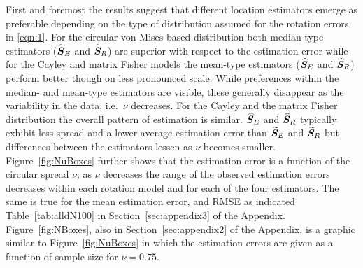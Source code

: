 First and foremost the results suggest that different location estimators emerge as preferable depending on the type of distribution assumed for the rotation errors in \eqref{eqn:1}.  For the circular-von Mises-based distribution both median-type estimators (${\widetilde{\bm S}_E}$ and ${\widetilde{\bm S}_R}$) are superior with respect to the estimation error while for the Cayley and matrix Fisher models the mean-type estimators (${\widehat{\bm S}_E}$ and ${\widehat{\bm S}_R}$) perform better though on less pronounced scale.  While preferences within the median- and mean-type estimators are visible, these generally disappear as the variability in the data, i.e.~$\nu$ decreases.  For the Cayley and the matrix Fisher distribution the overall pattern of estimation is similar. ${\widehat{\bm S}_E}$ and ${\widehat{\bm S}_R}$ typically exhibit less spread and a lower average estimation error than ${\widetilde{\bm S}_E}$ and ${\widetilde{\bm S}_R}$ but differences between the estimators lessen as $\nu$ becomes smaller. Figure~\ref{fig:NuBoxes} further shows that the estimation error is a function of the circular spread $\nu$; as $\nu$ decreases the range of the observed estimation errors decreases within each rotation model and for each of the four estimators. The same is true for the mean estimation error, and RMSE as indicated Table~\ref{tab:alldN100} in Section~\ref{sec:appendix3} of the Appendix.  Figure~\ref{fig:NBoxes}, also in Section~\ref{sec:appendix2} of the Appendix, is a graphic similar to Figure~\ref{fig:NuBoxes} in which the estimation errors are given as a function of sample size for $\nu=0.75$.


